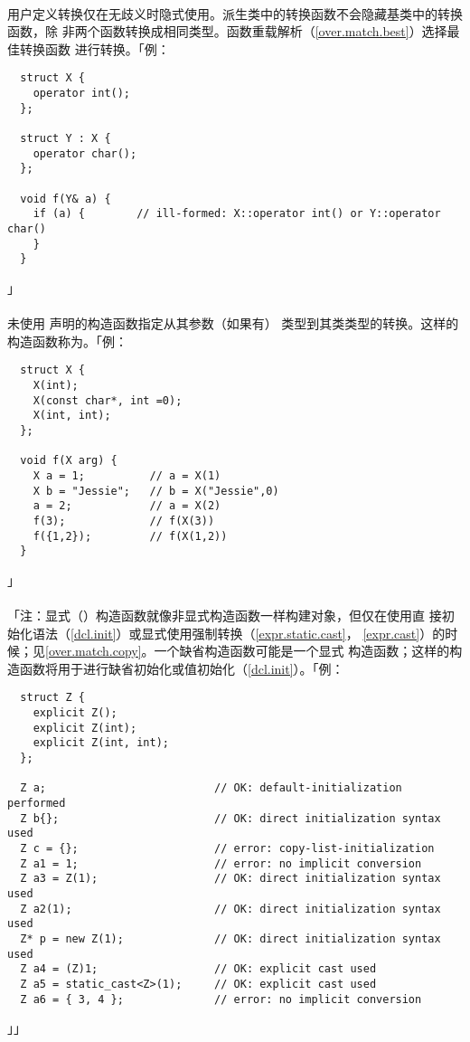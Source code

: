 \paragraph{}
用户定义转换仅在无歧义时隐式使用。派生类中的转换函数不会隐藏基类中的转换函数，除
非两个函数转换成相同类型。函数重载解析（\ref{over.match.best}）选择最佳转换函数
进行转换。「例：
\begin{lstlisting}
  struct X {
    operator int();
  };

  struct Y : X {
    operator char();
  };

  void f(Y& a) {
    if (a) {        // ill-formed: X::operator int() or Y::operator char()
    }
  }
\end{lstlisting}」

\paragraph{}
未使用 声明的构造函数指定从其参数（如果有）
类型到其类类型的转换。这样的构造函数称为。「例：
\begin{lstlisting}
  struct X {
    X(int);
    X(const char*, int =0);
    X(int, int);
  };

  void f(X arg) {
    X a = 1;          // a = X(1)
    X b = "Jessie";   // b = X("Jessie",0)
    a = 2;            // a = X(2)
    f(3);             // f(X(3))
    f({1,2});         // f(X(1,2))
  }
\end{lstlisting}」

\paragraph{}
「注：显式（）构造函数就像非显式构造函数一样构建对象，但仅在使用直
接初始化语法（\ref{dcl.init}）或显式使用强制转换（\ref{expr.static.cast}，
\ref{expr.cast}）的时候；见\ref{over.match.copy}。一个缺省构造函数可能是一个显式
构造函数；这样的构造函数将用于进行缺省初始化或值初始化（\ref{dcl.init}）。「例：
\begin{lstlisting}
  struct Z {
    explicit Z();
    explicit Z(int);
    explicit Z(int, int);
  };

  Z a;                          // OK: default-initialization performed
  Z b{};                        // OK: direct initialization syntax used
  Z c = {};                     // error: copy-list-initialization
  Z a1 = 1;                     // error: no implicit conversion
  Z a3 = Z(1);                  // OK: direct initialization syntax used
  Z a2(1);                      // OK: direct initialization syntax used
  Z* p = new Z(1);              // OK: direct initialization syntax used
  Z a4 = (Z)1;                  // OK: explicit cast used
  Z a5 = static_cast<Z>(1);     // OK: explicit cast used
  Z a6 = { 3, 4 };              // error: no implicit conversion
\end{lstlisting}」」

